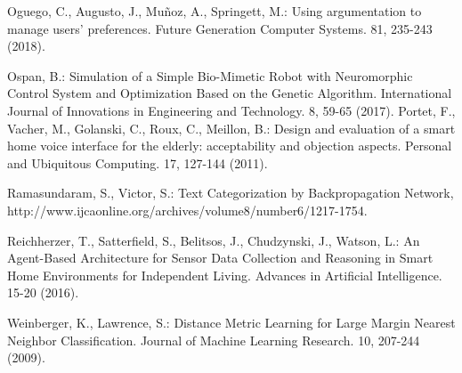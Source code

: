 \documentclass{llncs}
\begin{document}
\begin{thebibliography}{1}
        Oguego, C., Augusto, J., Muñoz, A., Springett, M.: Using argumentation to manage users’ preferences. Future Generation Computer Systems. 81, 235-243 (2018).

        Ospan, B.: Simulation of a Simple Bio-Mimetic Robot with Neuromorphic Control System and Optimization Based on the Genetic Algorithm. International Journal of Innovations in Engineering and Technology. 8, 59-65 (2017).
        Portet, F., Vacher, M., Golanski, C., Roux, C., Meillon, B.: Design and evaluation of a smart home voice interface for the elderly: acceptability and objection aspects. Personal and Ubiquitous Computing. 17, 127-144 (2011).

        Ramasundaram, S., Victor, S.: Text Categorization by Backpropagation Network, http://www.ijcaonline.org/archives/volume8/number6/1217-1754.

        Reichherzer, T., Satterfield, S., Belitsos, J., Chudzynski, J., Watson, L.: An Agent-Based Architecture for Sensor Data Collection and Reasoning in Smart Home Environments for Independent Living. Advances in Artificial Intelligence. 15-20 (2016).

        Weinberger, K., Lawrence, S.: Distance Metric Learning for Large Margin Nearest Neighbor Classification. Journal of Machine Learning Research. 10, 207-244 (2009).

    \end{thebibliography}
\end{document}
